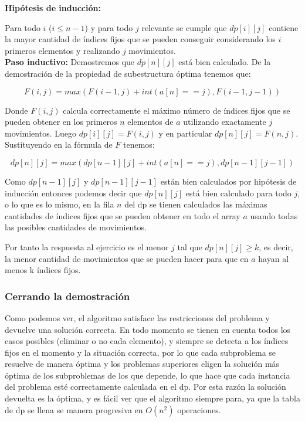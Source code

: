 \documentclass[11pt]{article}
\begin{document}
    \textbf{Hipótesis de inducción:}

    Para todo $i$ ($i \leq n-1$) y para todo $j$ relevante se cumple que $dp[i][j]$ contiene la mayor cantidad
    de índices fijos que se pueden conseguir considerando los $i$ primeros elementos y realizando $j$ movimientos.\\[10pt]

    \textbf{Paso inductivo:}
    Demostremos que $dp[n][j]$ está bien calculado. De la demostración de la propiedad de subestructura óptima
    tenemos que:

    \[
    F(i, j) = max(F(i-1, j) + int(a[n] == j), F(i-1, j-1))
    \]

    Donde $F(i, j)$ calcula correctamente el máximo número de índices fijos que se pueden obtener en los 
    primeros $n$ elementos de $a$ utilizando exactamente $j$ movimientos. Luego $dp[i][j] = F(i, j)$ y en 
    particular $dp[n][j] = F(n, j)$. Sustituyendo en la fórmula de $F$ tenemos:

    \[
    dp[n][j] = max(dp[n-1][j] + int(a[n] == j), dp[n-1][j-1])
    \]

    Como $dp[n-1][j]$ y $dp[n-1][j-1]$ están bien calculados por hipótesis de inducción entonces podemos
    decir que $dp[n][j]$ está bien calculado para todo $j$, o lo que es lo mismo, en la fila $n$ del dp se
    tienen calculados las máximas cantidades de índices fijos que se pueden obtener en todo el array $a$ 
    usando todas las posibles cantidades de movimientos.

    Por tanto la respuesta al ejercicio es el menor $j$ tal que $dp[n][j] \geq k$, es decir, la menor cantidad
    de movimientos que se pueden hacer para que en $a$ hayan al menos k índices fijos.

    \subsubsection{Cerrando la demostración}
    Como podemos ver, el algoritmo satisface las restricciones del problema y devuelve una solución correcta.
    En todo momento se tienen en cuenta todos los casos posibles (eliminar o no cada elemento), y siempre se
    detecta a los índices fijos en el momento y la situación correcta, por lo que cada subproblema se resuelve
    de manera óptima y los problemas superiores eligen la solución más óptima de los subproblemas de los que
    depende, lo que hace que cada instancia del problema esté correctamente calculada en el dp. Por esta razón
    la solución devuelta es la óptima, y es fácil ver que el algoritmo siempre para, ya que la tabla de dp se
    llena se manera progresiva en $O(n^2)$ operaciones.
\end{document}
